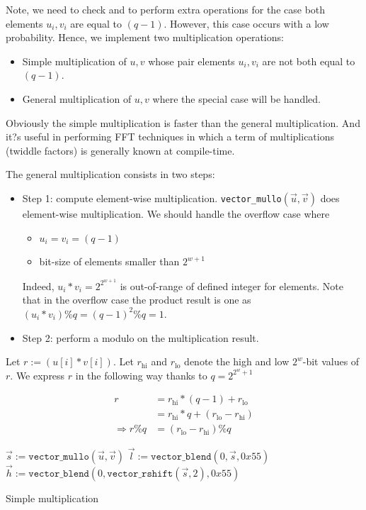 \documentclass[oneside,9pt]{article}
\begin{document}
Note, we need to check and to perform extra operations for the case both elements $u_i, v_i$ are equal to $(q-1)$. However, this case occurs with a low probability. Hence, we implement two multiplication operations:
\begin{itemize}
	\item Simple multiplication of $u, v$ whose pair elements  $u_i, v_i$ are not both equal to $(q-1)$.
	\item General multiplication of $u, v$ where the special case will be handled.
\end{itemize}

Obviously the simple multiplication is faster than the general multiplication. And it?s useful in performing FFT techniques in which a term of multiplications (twiddle factors) is generally known at compile-time. 

The general multiplication consists in two steps:
\begin{itemize}
\item Step 1: compute element-wise multiplication.
	\texttt{vector\_mullo}$(\vec{u}, \vec{v})$ does element-wise multiplication. We should handle the overflow case where
	\begin{itemize}
		\item $u_i = v_i = (q-1)$
		\item bit-size of elements smaller than $2^{w+1}$
	\end{itemize}
	Indeed, $u_i * v_i = 2^{2^{w+1}}$ is out-of-range of defined integer for elements.
	Note that in the overflow case the product result is one as $(u_i * v_i) \% q = (q-1)^2 \% q = 1$.
\item Step 2: perform a modulo on the multiplication result.
\end{itemize}
Let $r := (u[i]* v[i])$. Let $r_{\text{hi}}$ and $r_{\text{lo}}$ denote the high and low $2^w$-bit values of $r$.
We express $r$ in the following way thanks to $q = 2^{2^{w} + 1}$

\begin{equation}
\begin{split}
r &= r_{\text{hi}} * (q-1) + r_{\text{lo}} \\
  &= r_{\text{hi}} * q + (r_{\text{lo}} - r_{\text{hi}}) \\
\Rightarrow r \% q &= (r_{\text{lo}} - r_{\text{hi}}) \% q
\end{split}
\end{equation}

\begin{algorithm}[]
 $\vec{s} := \texttt{vector\_mullo}(\vec{u}, \vec{v})$\;
 $\vec{l} := \texttt{vector\_blend}(0, \vec{s},0x55)$\;
 $\vec{h} := \texttt{vector\_blend}(0, \texttt{vector\_rshift}(\vec{s}, 2), 0x55)$\;
 \caption{Simple multiplication}
\end{algorithm}
\end{document}
